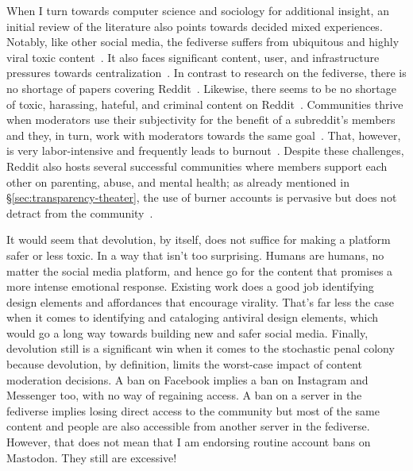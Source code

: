 When I turn towards computer science and sociology for additional insight, an
initial review of the literature also points towards decided mixed experiences.
Notably, like other social media, the fediverse suffers from ubiquitous and
highly viral toxic content~\cite{BinZiaRamanea2022}. It also faces significant
content, user, and infrastructure pressures towards
centralization~\cite{RamanJoglekarea2019}. In contrast to research on the
fediverse, there is no shortage of papers covering
Reddit~\cite{ProferesJonesea2021}. Likewise, there seems to be no shortage of
toxic, harassing, hateful, and criminal content on
Reddit~\cite{KwonShao2021,Massanari2017,RiegerKumpelea2021}. Communities thrive
when moderators use their subjectivity for the benefit of a subreddit's members
and they, in turn, work with moderators towards the same
goal~\cite{Gibson2019,SeeringWangea2019}. That, however, is very labor-intensive
and frequently leads to burnout~\cite{SchopkeGonzalezAtrejaea2022}. Despite
these challenges, Reddit also hosts several successful communities where members
support each other on parenting, abuse, and mental health; as already mentioned
in \S\ref{sec:transparency-theater}, the use of burner accounts is pervasive but
does not detract from the
community~\cite{AmmariSchoenebeckea2019,AndalibiHaimsonea2016,ChoudhuryDe2014,Leavitt2015,PavalanathanDeChoudhury2015,SchradingOvesdotterAlmea2015}.

It would seem that devolution, by itself, does not suffice for making a platform
safer or less toxic. In a way that isn't too surprising. Humans are humans, no
matter the social media platform, and hence go for the content that promises a
more intense emotional response. Existing work does a good job identifying
design elements and affordances that encourage virality. That's far less the
case when it comes to identifying and cataloging antiviral design elements,
which would go a long way towards building new and safer social media. Finally,
devolution still is a significant win when it comes to the stochastic penal
colony because devolution, by definition, limits the worst-case impact of
content moderation decisions. A ban on Facebook implies a ban on Instagram and
Messenger too, with no way of regaining access. A ban on a server in the
fediverse implies losing direct access to the community but most of the same
content and people are also accessible from another server in the fediverse.
However, that does not mean that I am endorsing routine account bans on
Mastodon. They still are excessive!



